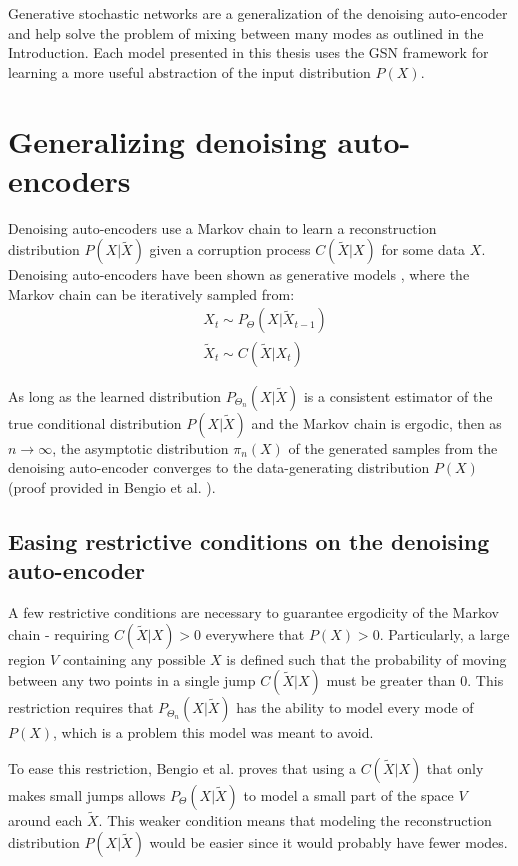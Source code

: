 Generative stochastic networks are a generalization of the denoising auto-encoder and help solve the problem of mixing between many modes as outlined in the Introduction. Each model presented in this thesis uses the GSN framework for learning a more useful abstraction of the input distribution \(P(X)\).



\section{Generalizing denoising auto-encoders}

Denoising auto-encoders use a Markov chain to learn a reconstruction distribution \(P(X|\widetilde{X})\) given a corruption process \(C(\widetilde{X}|X)\) for some data \(X\). Denoising auto-encoders have been shown as generative models \cite{bengio13a}, where the Markov chain can be iteratively sampled from:
\begin{align*}
 &X_t \sim P_\Theta(X|\widetilde{X}_{t-1})\\
 &\widetilde{X}_t \sim C(\widetilde{X}|X_t)
\end{align*}

As long as the learned distribution \(P_{\Theta_n}(X|\widetilde{X})\) is a consistent estimator of the true conditional distribution \(P(X|\widetilde{X})\) and the Markov chain is ergodic, then as \(n \rightarrow \infty\), the asymptotic distribution \(\pi_n(X)\) of the generated samples from the denoising auto-encoder converges to the data-generating distribution \(P(X)\) (proof provided in Bengio et al. \cite{bengio13a}). 


\subsection{Easing restrictive conditions on the denoising auto-encoder}

A few restrictive conditions are necessary to guarantee ergodicity of the Markov chain - requiring \(C(\widetilde{X}|X) > 0\) everywhere that \(P(X) > 0\). Particularly, a large region \(V\) containing any possible \(X\) is defined such that the probability of moving between any two points in a single jump \(C(\widetilde{X}|X)\) must be greater than 0. This restriction requires that \(P_{\Theta_n}(X|\widetilde{X})\) has the ability to model every mode of \(P(X)\), which is a problem this model was meant to avoid.

To ease this restriction, Bengio et al. \cite{gsn} proves that using a \(C(\widetilde{X}|X)\) that only makes small jumps allows \(P_{\Theta}(X|\widetilde{X})\) to model a small part of the space \(V\) around each \(\widetilde{X}\). This weaker condition means that modeling the reconstruction distribution \(P(X|\widetilde{X})\) would be easier since it would probably have fewer modes. 

